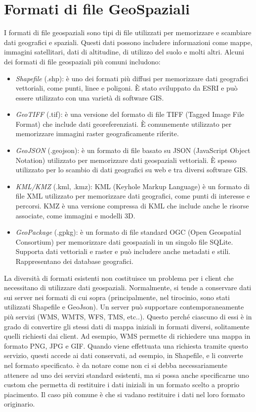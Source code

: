 \section{Formati di file GeoSpaziali}
I formati di file geospaziali sono tipi di file utilizzati per memorizzare e scambiare dati geografici e spaziali. Questi dati possono includere informazioni come mappe, immagini satellitari, dati di altitudine, di utilizzo del suolo e molti altri. Alcuni dei formati di file geospaziali più comuni includono:
\begin{itemize}
      \item \textit {Shapefile} (.shp): è uno dei formati più diffusi per memorizzare dati geografici vettoriali, come punti, linee e poligoni. È stato sviluppato da ESRI e può essere utilizzato con una varietà di software GIS.
      \item \textit {GeoTIFF} (.tif): è una versione del formato di file TIFF (Tagged Image File Format) che include dati georeferenziati. È comunemente utilizzato per memorizzare immagini raster geograficamente riferite.
      \item \textit {GeoJSON} (.geojson): è un formato di file basato su JSON (JavaScript Object Notation) utilizzato per memorizzare dati geospaziali vettoriali. È spesso utilizzato per lo scambio di dati geografici su web e tra diversi software GIS.
      \item \textit {KML/KMZ} (.kml, .kmz): KML (Keyhole Markup Language) è un formato di file XML utilizzato per memorizzare dati geografici, come punti di interesse e percorsi. KMZ è una versione compressa di KML che include anche le risorse associate, come immagini e modelli 3D.
      \item \textit {GeoPackage} (.gpkg): è un formato di file standard OGC (Open Geospatial Consortium) per memorizzare dati geospaziali in un singolo file SQLite. Supporta dati vettoriali e raster e può includere anche metadati e stili. Rappresentano dei database geografici.
\end{itemize}
La diversità di formati esistenti non costituisce un problema per i client che necessitano di utilizzare dati geospaziali. Normalmente,
si tende a conservare dati sui server nei formati di cui sopra (principalmente, nel tirocinio, sono stati utilizzati Shapefile e GeoJson). Un server può supportare contemporaneamente più servizi (WMS, WMTS, WFS, TMS, etc..). Questo perché ciascuno di essi è in grado di convertire gli stessi dati di mappa iniziali in formati diversi, solitamente quelli richiesti dai client.
Ad esempio, WMS permette di richiedere una mappa in formato PNG, JPG e GIF. Quando viene effettuata una richiesta tramite questo servizio, questi accede ai dati conservati, ad esempio, in Shapefile, e li converte nel formato specificato. è da notare come non ci si debba necessariamente attenere ad uno dei servizi standard esistenti, ma si possa anche specificarne uno custom che permetta di restituire i dati iniziali in un formato scelto a proprio piacimento. Il caso più comune è che si vadano restituire i dati nel loro formato originario.

